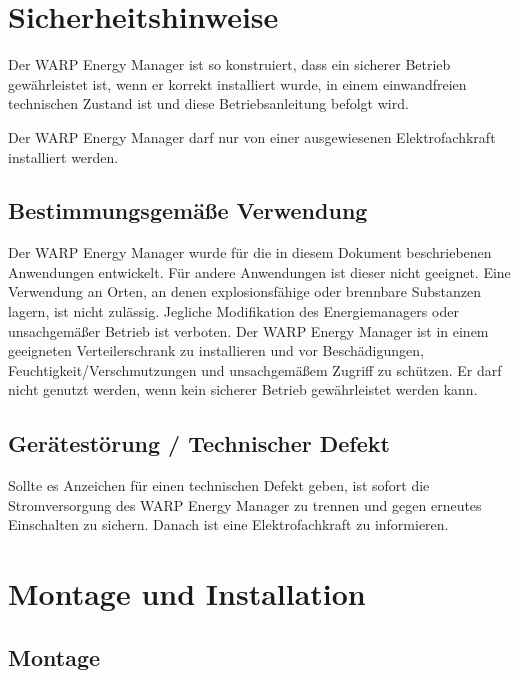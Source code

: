 \documentclass[a4paper,10pt]{article}
\newcommand{\hint}[1]{\begin{tcolorbox}[colback=boxgray,colframe=black,coltext=
white,title=Hinweis,left*=2mm,right*=2mm,boxsep=1mm,bottom=1mm,top=1mm]#1\end{tcolorbox}}
\begin{document}
\begin{multicols*}{2}
	\newpage
	\section{Sicherheitshinweise}
	Der WARP Energy Manager ist so konstruiert, dass ein sicherer Betrieb gewährleistet ist,
	wenn er korrekt installiert wurde, in einem einwandfreien technischen Zustand
	ist und diese Betriebsanleitung befolgt wird. \hint{Der WARP Energy Manager darf nur von einer ausgewiesenen Elektrofachkraft installiert
		werden.}

	\subsection{Bestimmungsgemäße Verwendung}
    Der WARP Energy Manager wurde für die in diesem Dokument beschriebenen Anwendungen entwickelt.
    Für andere Anwendungen ist dieser nicht geeignet. Eine Verwendung
	an Orten, an denen explosionsfähige oder brennbare Substanzen lagern, ist nicht
	zulässig. Jegliche Modifikation des Energiemanagers oder unsachgemäßer Betrieb ist verboten.
	Der WARP Energy Manager ist in einem geeigneten Verteilerschrank zu installieren
	und vor Beschädigungen, Feuchtigkeit/Verschmutzungen und unsachgemäßem
	Zugriff zu schützen. Er darf nicht genutzt werden, wenn kein sicherer Betrieb
	gewährleistet werden kann.

	\subsection{Gerätestörung / Technischer Defekt}
	Sollte es Anzeichen für einen technischen Defekt geben, ist sofort die
	Stromversorgung des WARP Energy Manager zu trennen und gegen erneutes Einschalten zu
	sichern. Danach ist eine Elektrofachkraft zu informieren.

	\newpage
	\section{Montage und Installation}
	\subsection{Montage}

\end{multicols*}
\end{document}
